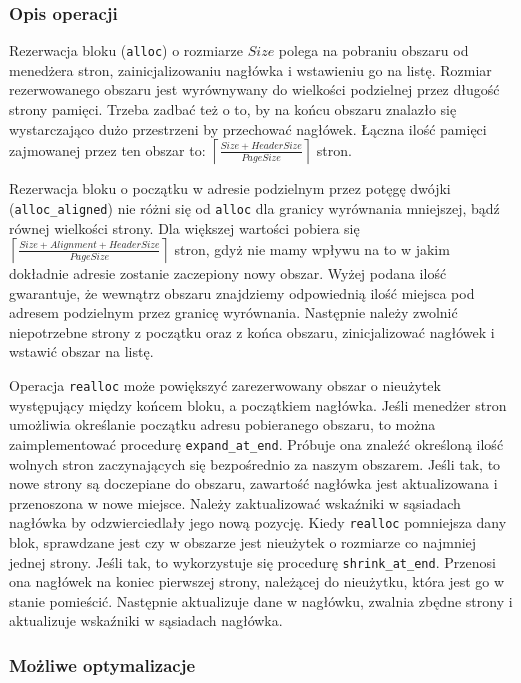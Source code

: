 \documentclass[12pt,a4paper,titlepage,twoside]{mwart}
\begin{document}
\subsubsection{Opis operacji}

Rezerwacja bloku (\verb+alloc+) o rozmiarze $Size$ polega na pobraniu obszaru od
menedżera stron, zainicjalizowaniu nagłówka i wstawieniu go na listę. Rozmiar
rezerwowanego obszaru jest wyrównywany do wielkości podzielnej przez długość
strony pamięci. Trzeba zadbać też o to, by na końcu obszaru znalazło się
wystarczająco dużo przestrzeni by przechować nagłówek. Łączna ilość pamięci
zajmowanej przez ten obszar to:
$\left\lceil\frac{Size + HeaderSize}{PageSize}\right\rceil$ stron.

Rezerwacja bloku o początku w adresie podzielnym przez potęgę dwójki
(\verb+alloc_aligned+) nie różni się od \verb+alloc+ dla granicy wyrównania
mniejszej, bądź równej wielkości strony. Dla większej wartości pobiera się 
$\left\lceil\frac{Size + Alignment + HeaderSize}{PageSize}\right\rceil$
stron, gdyż nie mamy wpływu na to w jakim dokładnie adresie zostanie zaczepiony
nowy obszar. Wyżej podana ilość gwarantuje, że wewnątrz obszaru znajdziemy
odpowiednią ilość miejsca pod adresem podzielnym przez granicę wyrównania.
Następnie należy zwolnić niepotrzebne strony z początku oraz z końca obszaru,
zinicjalizować nagłówek i wstawić obszar na listę.

Operacja \verb+realloc+ może powiększyć zarezerwowany obszar o nieużytek
występujący między końcem bloku, a początkiem nagłówka. Jeśli menedżer stron
umożliwia określanie początku adresu pobieranego obszaru, to można
zaimplementować procedurę \verb+expand_at_end+. Próbuje ona znaleźć określoną
ilość wolnych stron zaczynających się bezpośrednio za naszym obszarem. Jeśli
tak, to nowe strony są doczepiane do obszaru, zawartość nagłówka jest
aktualizowana i przenoszona w nowe miejsce. Należy zaktualizować wskaźniki w
sąsiadach nagłówka by odzwierciedlały jego nową pozycję. Kiedy \verb+realloc+
pomniejsza dany blok, sprawdzane jest czy w obszarze jest nieużytek o rozmiarze
co najmniej jednej strony. Jeśli tak, to wykorzystuje się procedurę
\verb+shrink_at_end+. Przenosi ona nagłówek na koniec pierwszej strony,
należącej do nieużytku, która jest go w stanie pomieścić. Następnie aktualizuje
dane w nagłówku, zwalnia zbędne strony i aktualizuje wskaźniki w sąsiadach
nagłówka.

\subsubsection{Możliwe optymalizacje}
\end{document}
